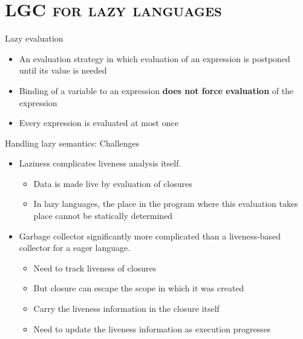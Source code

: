 \documentclass[xcolor=x11names,compress,mathserif]{beamer}
\renewcommand{\(}{\begin{columns}}
\renewcommand{\)}{\end{columns}}
\newcommand{\<}[1]{\begin{column}{#1}}
\renewcommand{\>}{\end{column}}
\begin{document}

\section{\scshape LGC for lazy languages}
\begin{frame} {Lazy evaluation}
\begin{itemize}
\item An evaluation  strategy in which evaluation of  an expression is
  postponed until its value is needed
\item Binding  of a  variable to  an expression  {\bf does  not force
  evaluation} of the expression
\item Every expression is evaluated at most once
\end{itemize}
\end{frame}
\begin{frame}{Handling lazy semantics: Challenges}
\normalsize
  \begin{itemize}[<+->]\itemsep2em
  \item Laziness complicates liveness analysis itself. 
    \begin{itemize}
    \item Data is made live by evaluation of closures
    \item In lazy languages, the place in the program
      where this evaluation takes place cannot be statically determined
    \end{itemize}
  \item Garbage collector significantly more complicated than a liveness-based
    collector for a eager language.
    \begin{itemize}
    \item Need to track liveness of closures
    \item But closure can escape the scope in which it was created
    \item Carry the liveness information in the closure itself
    \item Need to update the liveness information as execution progresses
    \end{itemize}
  \end{itemize}
\end{frame}
\end{document}
